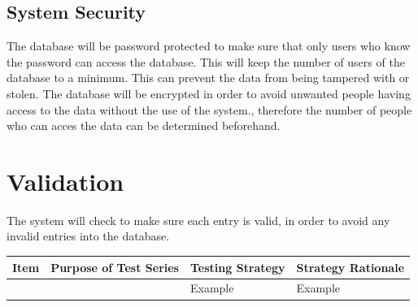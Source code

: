 \subsection{System Security}

The database will be password protected to make sure that only users who know the password can access the database. This will keep the number of users of the database to a minimum. This can prevent the data from being tampered with or stolen. The database will be encrypted in order to avoid unwanted people having access to the data without the use of the system., therefore the number of people who can acces the data can be determined beforehand.

\section{Validation}

The system will check to make sure each entry is valid, in order to avoid any invalid entries into the database. 

\begin{center}
    \begin{tabular}{|p{2cm}|p{5cm}|p{5cm}|p{4cm}|}
        \hline
        \textbf{Item} & \textbf{Purpose of Test Series} & \textbf{Testing Strategy} & \textbf{Strategy Rationale}\\ \hline
         &  & Example & Example \\ \hline
    \end{tabular}
\end{center}


